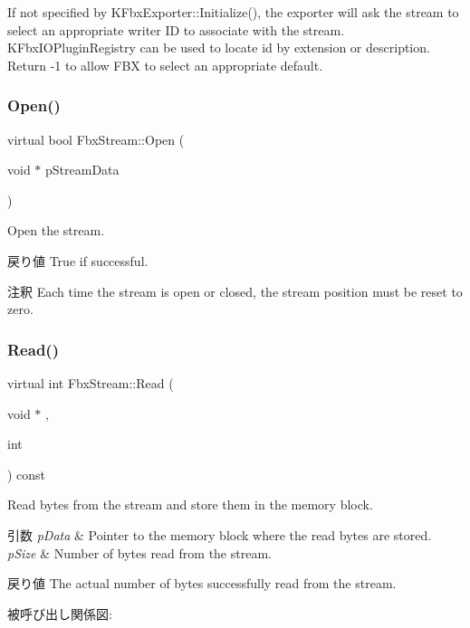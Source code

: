 If not specified by K\+Fbx\+Exporter\+::\+Initialize(), the exporter will ask the stream to select an appropriate writer ID to associate with the stream. K\+Fbx\+I\+O\+Plugin\+Registry can be used to locate id by extension or description. Return -\/1 to allow F\+BX to select an appropriate default. \mbox{\label{class_fbx_stream_ab8b3c6e904344c1b1d74e457ae8a74e7}} 
\subsubsection{\texorpdfstring{Open()}{Open()}}
{\footnotesize\ttfamily virtual bool Fbx\+Stream\+::\+Open (\begin{DoxyParamCaption}\item[{void $\ast$}]{p\+Stream\+Data }\end{DoxyParamCaption})\hspace{0.3cm}{\ttfamily [pure virtual]}}

Open the stream. \begin{DoxyReturn}{戻り値}
True if successful. 
\end{DoxyReturn}
\begin{DoxyRemark}{注釈}
Each time the stream is open or closed, the stream position must be reset to zero. 
\end{DoxyRemark}
\mbox{\label{class_fbx_stream_a2621d456bfda1f0e4e3492bcc81ec2e6}} 
\subsubsection{\texorpdfstring{Read()}{Read()}\hspace{0.1cm}{\footnotesize\ttfamily [1/3]}}
{\footnotesize\ttfamily virtual int Fbx\+Stream\+::\+Read (\begin{DoxyParamCaption}\item[{void $\ast$}]{,  }\item[{int}]{ }\end{DoxyParamCaption}) const\hspace{0.3cm}{\ttfamily [pure virtual]}}

Read bytes from the stream and store them in the memory block. 
\begin{DoxyParams}{引数}
{\em p\+Data} & Pointer to the memory block where the read bytes are stored. \\
\hline
{\em p\+Size} & Number of bytes read from the stream. \\
\hline
\end{DoxyParams}
\begin{DoxyReturn}{戻り値}
The actual number of bytes successfully read from the stream. 
\end{DoxyReturn}
被呼び出し関係図\+:
\mbox{\label{class_fbx_stream_ad54e82f43c2b8b441c427a77d2663a7e}} 
